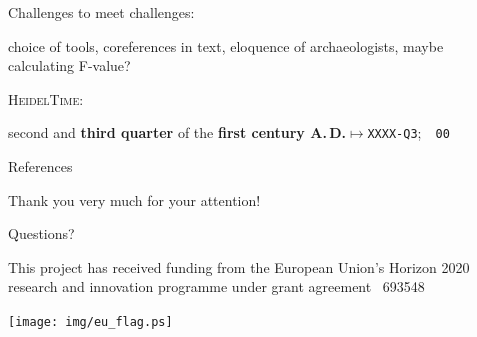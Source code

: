 \documentclass[xcolor=x11names, aspectratio=169,usenames,dvipsnames]{beamer}
\begin{document}
\begin{frame}{Challenges to meet}
challenges:

choice of tools, coreferences in text, eloquence of archaeologists, maybe calculating F-value?

\textsc{HeidelTime}:\vspace{-1em}
\begin{center}
second and \textbf{third quarter} of the \textbf{first century A.\,D.}\quad$\longmapsto$\quad\texttt{XXXX-Q3};~~\texttt{00}
\end{center}
\end{frame}

\begin{frame}{References}

\printbibliography[heading=none]
\end{frame}


\begin{frame}[plain]
\vfill\vfill\vfill
\begin{center}\Large
Thank you very much for your attention!\\\bigskip

Questions?
\end{center}\vfill\vfill

\hfill
\begin{minipage}{0.7\textwidth}\scriptsize
\begin{flushright}
This project has received funding from the European Union's Horizon 2020 research and innovation programme under grant agreement \textnumero\ 693548
\end{flushright}
\end{minipage}\hspace*{1em}
\begin{minipage}{0.1\textwidth}
\texttt{[image: img/eu\_flag.ps]}
\end{minipage}
\end{frame}

\maketitle
\end{document}
